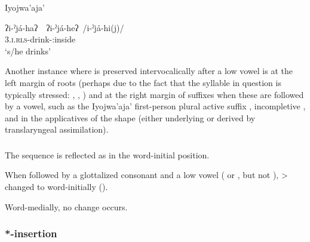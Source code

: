 \ea
Iyojwa'aja' \citep{JC14a}
    \begin{xlist}
        \ex \gll ʔi-ˀjá-haʔ~\recind~ʔi-ˀjá-heʔ~/i\mbox{-}ˀjå\mbox{-}hi(j)/\\
        3.\textsc{i.rls}-drink-\APPL:inside\\
        \glt `s/he drinks'
    \end{xlist}
\z

Another instance where  is preserved intervocalically after a low vowel is at the left margin of roots (perhaps due to the fact that the syllable in question is typically stressed: , , ) and at the right margin of suffixes when these are followed by a vowel, such as the Iyojwa’aja’ first-person plural active suffix , incompletive , and in the applicatives of the shape  (either underlying or derived by translaryngeal assimilation).

\subsubsection{}\label{ch-ji}

The sequence  is reflected as  in the word-initial position.

\begin{exe}
    \ex \dew
    \ex \wax
    \ex \water
    \ex \mancw
    \ex \truev
\end{exe}

When followed by a glottalized consonant and a low vowel ( or , but not ),  >  changed to  word-initially ().

\begin{exe}
    \ex \jaguar
    \ex \treen
    \ex \vulture
\end{exe}

Word-medially, no change occurs.

\begin{exe}
    \ex \costumepl
    \ex \bloodpl
\end{exe}

\subsubsection{*-insertion}\label{ch-saltillo}

